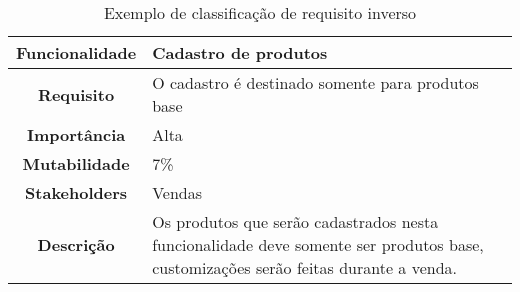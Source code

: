       \begin{table}[h!]
        \centering
        \begin{tabular}{|c|p{10cm}|}
          \hline
          \textbf{Funcionalidade} &
          Cadastro de produtos \\ \hline
          \textbf{Requisito} &
          O cadastro é destinado somente para produtos base \\ \hline
          \textbf{Importância} &
          Alta \\ \hline
          \textbf{Mutabilidade} &
          7\% \\ \hline
          \textbf{Stakeholders} &
          Vendas \\ \hline
          \textbf{Descrição} &
          Os produtos que serão cadastrados nesta funcionalidade deve somente ser
          produtos base, customizações serão feitas durante a venda. \\ \hline
        \end{tabular}
        \caption{Exemplo de classificação de requisito inverso}
        \label{Tabela:7}
      \end{table}

